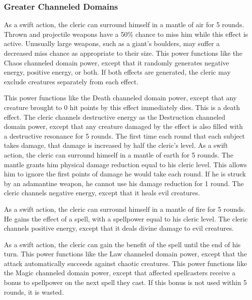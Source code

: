 \subsubsection{Greater Channeled Domains}\label{Greater Channeled Domains}

As a swift action, the cleric can surround himself in a mantle of air for 5 rounds.
Thrown and projectile weapons have a 50\% chance to miss him while this effect is active.
Unusually large weapons, such as a giant's boulders, may suffer a decreased miss chance as appropriate to their size.
This power functions like the Chaos channeled domain power, except that it randomly generates negative energy, positive energy, or both.
If both effects are generated, the cleric may exclude creatures separately from each effect.

This power functions like the Death channeled domain power, except that any creature brought to 0 hit points by this effect immediately dies.
This is a death effect.
The cleric channels destructive energy as the Destruction channeled domain power, except that any creature damaged by the effect is also filled with a destructive resonance for 5 rounds.
The first time each round that each subject takes damage, that damage is increased by half the cleric's level.
As a swift action, the cleric can surround himself in a mantle of earth for 5 rounds.
The mantle grants him physical damage reduction equal to his cleric level.
This allows him to ignore the first points of damage he would take each round.
If he is struck by an adamantine weapon, he cannot use his damage reduction for 1 round.
The cleric channels negative energy, except that it heals evil creatures.

As a swift action, the cleric can surround himself in a mantle of fire for 5 rounds.
He gains the effect of a  spell, with a spellpower equal to his cleric level.
The cleric channels positive energy, except that it deals divine damage to evil creatures.

 As a swift action, the cleric can gain the benefit of the 
spell until the end of his turn.
This power functions like the Law channeled domain power, except that the attack automatically succeeds against chaotic creatures.
This power functions like the Magic channeled domain power, except that affected spellcasters receive a  bonus to spellpower on the next spell they cast.
If this bonus is not used within 5 rounds, it is wasted.

